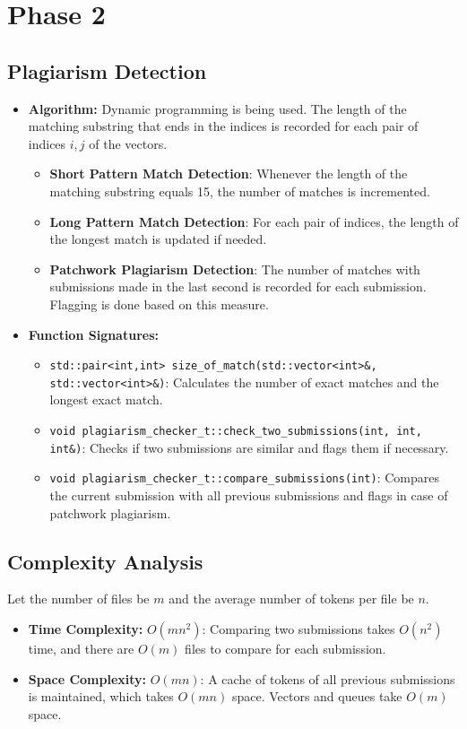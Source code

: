 \documentclass[11pt]{article}
\let\oldtexttt\texttt
\def\texttt#1{{\color{RoyalBlue}\oldtexttt{#1}}}
\begin{document}
\section{Phase 2}
\vspace{-5pt}
\subsection{Plagiarism Detection}
\begin{itemize}[noitemsep]
    \item \textbf{Algorithm:} Dynamic programming is being used. The length of the matching substring that ends in the indices is recorded for each pair of indices $i, j$ of the vectors.
    \begin{itemize}
        \item \textbf{Short Pattern Match Detection}: Whenever the length of the matching substring equals 15, the number of matches is incremented.
        \item \textbf{Long Pattern Match Detection}: For each pair of indices, the length of the longest match is updated if needed.
        \item \textbf{Patchwork Plagiarism Detection}: The number of matches with submissions made in the last second is recorded for each submission. Flagging is done based on this measure.
    \end{itemize}
    \item \textbf{Function Signatures:}
    \begin{itemize}
        \item \texttt{std::pair<int,int> size\_of\_match(std::vector<int>\&, std::vector<int>\&)}:
        Calculates the number of exact matches and the longest exact match.
        \item \texttt{void plagiarism\_checker\_t::check\_two\_submissions(int, int, int\&)}:
        Checks if two submissions are similar and flags them if necessary.
        \item \texttt{void plagiarism\_checker\_t::compare\_submissions(int)}:
        Compares the current submission with all previous submissions and flags in case of patchwork plagiarism.
    \end{itemize}
\end{itemize}
\vspace{-5pt}
\subsection{Complexity Analysis}
Let the number of files be $m$ and the average number of tokens per file be $n$.
\begin{itemize}[noitemsep]
    \item \textbf{Time Complexity:} $O(mn^2)$: Comparing two submissions takes $O(n^2)$ time, and there are $O(m)$ files to compare for each submission.
    \item \textbf{Space Complexity:} $O(mn)$: A cache of tokens of all previous submissions is maintained, which takes $O(mn)$ space. Vectors and queues take $O(m)$ space.
\end{itemize}
\vspace{-5pt}
\end{document}
